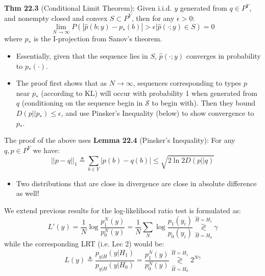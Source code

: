 \documentclass[12pt]{article} %
\newcommand{\LRT}[2]{%
  \mathrel{\mathop\gtrless\limits^{#1}_{#2}}%
}
\begin{document}
\separate

\textbf{Thm 22.3} (Conditional Limit Theorem): Given i.i.d. $y$ generated from $q \in P^Y$, and nonempty closed and convex $S \subset P^Y$, then for any $\epsilon > 0$:
\begin{equation*}
    \lim_{N \rightarrow \infty} P(|\hat{p}(b;y) - p_*(b)| > \epsilon |
    \hat{p}(\cdot; y) \in S
    ) = 0
\end{equation*}
where $p_*$ is the I-projection from Sanov's theorem.
\begin{itemize}[topsep=-1pt, itemsep=-1pt]
    \item 
Essentially, given that the sequence lies in $S$, $\hat{p}(\cdot;y)$ converges in probability to $p_*(\cdot)$.
    \item 
The proof first shows that as $N \rightarrow \infty$, sequences corresponding to types $p$ near $p_*$ (according to KL) will occur with probability 1 when generated from $q$ (conditioning on the sequence begin in $\mathcal{S}$ to begin with). Then they bound $D(p||p_*) \leq \epsilon$, and use Pinsker's Inequality (below) to show convergence to $p_*$.
\end{itemize}

The proof of the above uses \textbf{Lemma 22.4} (Pinsker's Inequality): For any $q,p \in P^Y$ we have:
\begin{equation*}
    ||p - q||_1 \triangleq
    \sum_{b \in Y}
    |p(b) - q(b)|
    \leq
    \sqrt{2 \ln 2D(p||q)}
\end{equation*}
\begin{itemize}[topsep=-1pt, itemsep=-1pt]
    \item 
Two distributions that are close in divergence are close in absolute difference as well!
\end{itemize}

\newpage
{}

We extend previous results for the log-likelihood ratio test is formulated as:
\begin{equation*}
    L'(y) =
    \frac{1}{N} \log \frac{p_1^N(y)}{p_0^N(y)}
    =
    \frac{1}{N} \sum_N \log \frac{p_1(y_i)}{p_0(y_i)}
    \LRT{\hat{H} = H_1}{\hat{H} = H_0} \gamma
\end{equation*}
while the corresponding LRT (i.e. Lec 2) would be:
\begin{equation*}
    L(y)
    \triangleq
    \frac{p_{y|H}(y|H_1)}{p_{y|H}(y|H_0)}
    =
    \frac{p_1^N(y)}{p_0^N(y)}
    \LRT{\hat{H} = H_1}{\hat{H} = H_0} 2^{N\gamma}
\end{equation*}
\end{document}
